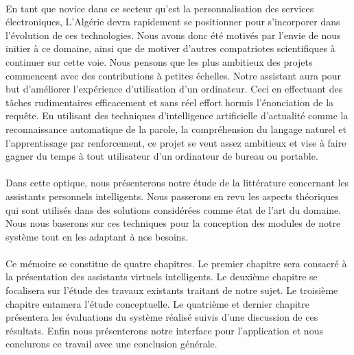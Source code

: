 \paragraph{}
En tant que novice dans ce secteur qu'est la personnalisation des services électroniques, L'Algérie devra rapidement se positionner pour s'incorporer dans l'évolution de ces technologies. Nous avons donc été motivés par l'envie de nous initier à ce domaine, ainsi que de motiver d'autres compatriotes scientifiques à continuer sur cette voie. Nous pensons que les plus ambitieux des projets commencent avec des contributions à petites échelles. Notre assistant aura pour but d'améliorer l'expérience d'utilisation d'un ordinateur. Ceci en effectuant des tâches rudimentaires efficacement et sans réel effort hormis l'énonciation de la requête. En utilisant des techniques d'intelligence artificielle d'actualité comme la reconnaissance automatique de la parole, la compréhension du langage naturel et l'apprentissage par renforcement, ce projet se veut assez ambitieux et vise à faire gagner du temps à tout utilisateur d'un ordinateur de bureau ou portable.
	
\paragraph{}
Dans cette optique, nous présenterons notre étude de la littérature concernant les assistants personnels intelligents. Nous passerons en revu les aspects théoriques qui sont utilisés dans des solutions considérées comme état de l'art du domaine. Nous nous baserons sur ces techniques pour la conception des modules de notre système tout en les adaptant à nos besoins. 

\paragraph{}
Ce mémoire se constitue de quatre chapitres. Le premier chapitre sera consacré à la présentation des assistants virtuels intelligents. Le deuxième chapitre se focalisera sur l'étude des travaux existants traitant de notre sujet. Le troisième chapitre entamera l'étude conceptuelle. Le quatrième et dernier chapitre présentera les évaluations du système réalisé suivis d'une discussion de ces résultats. Enfin nous présenterons notre interface pour l'application et nous conclurons ce travail avec une conclusion générale.